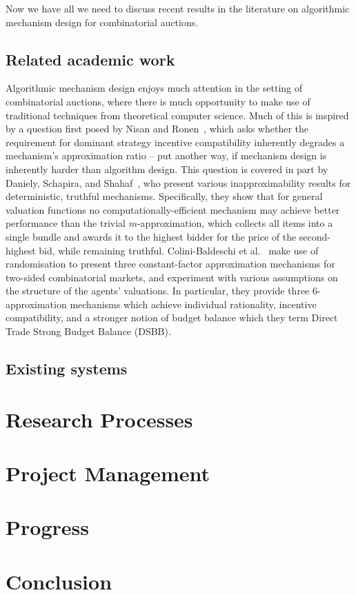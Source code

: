 \documentclass[10pt,a4paper]{article}
\theoremstyle{plain}
\theoremstyle{definition}
\begin{document}
	Now we have all we need to discuss recent results in the literature on
	algorithmic mechanism design for combinatorial auctions.

	\subsection{Related academic work}

	Algorithmic mechanism design enjoys much attention in the setting of
	combinatorial auctions, where there is much opportunity to make use of
	traditional techniques from theoretical computer science. Much of this is
	inspired by a question first posed by Nisan and Ronen~\cite{Nisan2001},
	which asks whether the requirement for dominant strategy incentive
	compatibility inherently degrades a mechanism's approximation ratio -- put
	another way, if mechanism design is inherently harder than algorithm
	design. This question is covered in part by Daniely, Schapira, and
	Shahaf~\cite{Daniely2018}, who present various inapproximability results
	for deterministic, truthful mechanisms. Specifically, they show that for
	general valuation functions no computationally-efficient mechanism may
	achieve better performance than the trivial $m$-approximation, which
	collects all items into a single bundle and awards it to the highest bidder
	for the price of the second-highest bid, while remaining truthful.
	Colini-Baldeschi et al.~\cite{ColiniBaldeschi2017} make use of
	randomisation to present three constant-factor approximation mechanisms for
	two-sided combinatorial markets, and experiment with various assumptions on
	the structure of the agents' valuations. In particular, they provide three
	6-approximation mechanisms which achieve individual rationality, incentive
	compatibility, and a stronger notion of budget balance which they term
	Direct Trade Strong Budget Balance (DSBB).


	\subsection{Existing systems}


\section{Research Processes}
	\label{sec:researchProcesses}

\section{Project Management}
	\label{sec:projectManagement}

\section{Progress}
	\label{sec:progress}

\section{Conclusion}
	\label{sec:conclusion}


\end{document}
